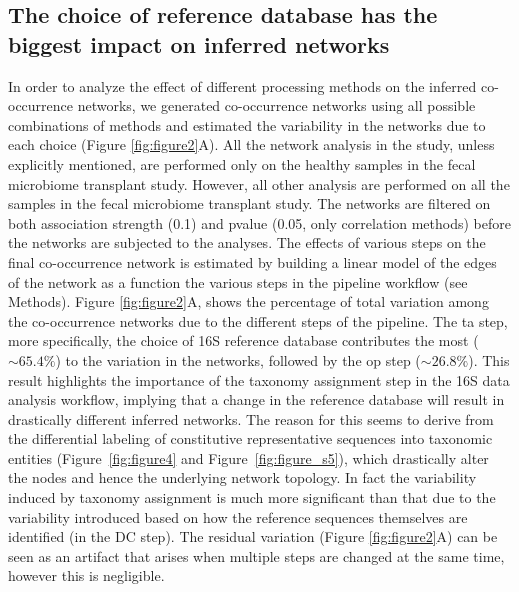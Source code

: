   \FloatBarrier

  \subsection*{The choice of reference database has the biggest impact on inferred networks}

  In order to analyze the effect of different processing methods on the inferred co-occurrence networks, we generated co-occurrence networks using all possible combinations of methods and estimated the variability in the networks due to each choice (Figure \ref{fig:figure2}A).
  All the network analysis in the study, unless explicitly mentioned, are performed only on the healthy samples in the fecal microbiome transplant study.
  However, all other analysis are performed on all the samples in the fecal microbiome transplant study.
  The networks are filtered on both association strength (0.1) and pvalue (0.05, only correlation methods) before the networks are subjected to the analyses.
  The effects of various steps on the final co-occurrence network is estimated by building a linear model of the edges of the network as a function the various steps in the pipeline workflow (see Methods).
  Figure \ref{fig:figure2}A, shows the percentage of total variation among the co-occurrence networks due to the different steps of the pipeline.
  The \ac{ta} step, more specifically, the choice of 16S reference database contributes the most ($\sim65.4\%$) to the variation in the networks, followed by the \ac{op} step ($\sim26.8\%$).
  This result highlights the importance of the taxonomy assignment step in the 16S data analysis workflow, implying that a change in the reference database will result in drastically different inferred networks.
  The reason for this seems to derive from the differential labeling of constitutive representative sequences into taxonomic entities (Figure~\ref{fig:figure4} and Figure~\ref{fig:figure_s5}), which drastically alter the nodes and hence the underlying network topology.
  In fact the variability induced by taxonomy assignment is much more significant than that due to the variability introduced based on how the reference sequences themselves are identified (in the DC step).
  The residual variation (Figure \ref{fig:figure2}A) can be seen as an artifact that arises when multiple steps are changed at the same time, however this is negligible.

